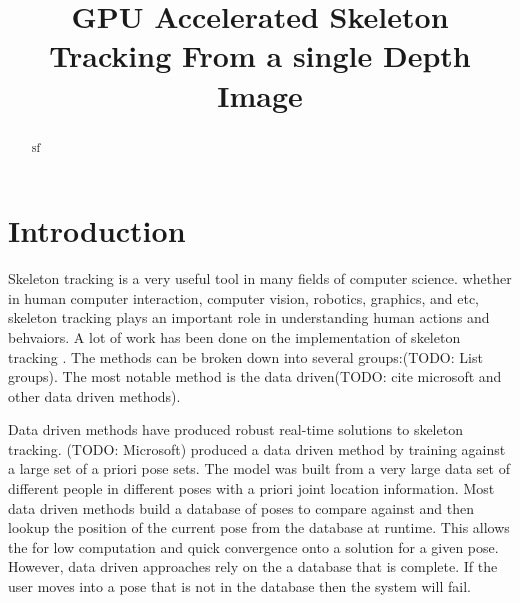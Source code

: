 \documentclass[conference]{IEEEtran}
\begin{document}
\title{GPU Accelerated Skeleton Tracking From a single Depth Image}



\author{}

\maketitle

\begin{abstract}
sf
\end{abstract}

\IEEEpeerreviewmaketitle

\section{Introduction}
Skeleton tracking is a very useful tool in many fields of computer science. whether in human computer interaction, computer vision, robotics, graphics, and etc, skeleton tracking plays an important role in understanding human actions and behvaiors. A lot of work has been done on the implementation of skeleton tracking \cite{Ganapathi2010,Bleiweiss2009,Baak2011,Plagemann2010,Knoop2009}. The methods can be broken down into several groups:(TODO: List groups). The most notable method is the data driven\cite{Baak2011}(TODO: cite microsoft and other data driven methods).

Data driven methods have produced robust real-time solutions to skeleton tracking\cite{Baak2011}. (TODO: Microsoft) produced a data driven method by training against a large set of a priori pose sets. The model was built from a very large data set of different people in different poses with a priori joint location information. Most data driven methods build a database of poses to compare against and then lookup the position of the current pose from the database at runtime. This allows the for low computation and quick convergence onto a solution for a given pose. However, data driven approaches rely on the a database that is complete. If the user moves into a pose that is not in the database then the system will fail.
\end{document}

